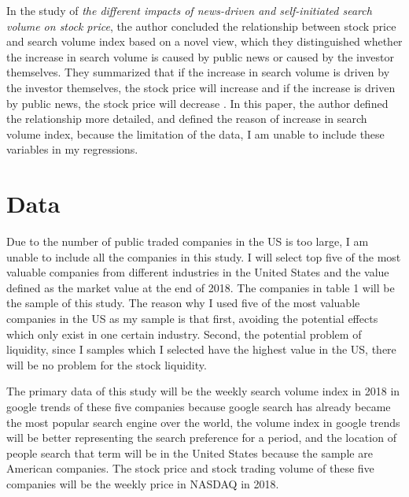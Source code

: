 \documentclass[12pt,english]{article}
\begin{document}
\newline
In the study of \textit{the different impacts of news-driven and self-initiated search volume on stock price}, the author concluded the relationship between stock price and search volume index based on a novel view, which they distinguished whether the increase in search volume is caused by public news or caused by the investor themselves. They summarized that if the increase in search volume is driven by the investor themselves, the stock price will increase and if the increase is driven by public news, the stock price will decrease \citep{liu2016different}. In this paper, the author defined the relationship more detailed, and defined the reason of increase in search volume index, because the limitation of the data, I am unable to include these variables in my regressions.


\section{Data}
Due to the number of public traded companies in the US is too large, I am unable to include all the companies in this study. I will select top five of the most valuable companies from different industries in the United States and the value defined as the market value at the end of 2018. The companies in table 1 will be the sample of this study. The reason why I used five of the most valuable companies in the US as my sample is that first, avoiding the potential effects which only exist in one certain industry. Second, the potential problem of liquidity, since I samples which I selected have the highest value in the US, there will be no problem for the stock liquidity.
\newline

\newline
The primary data of this study will be the weekly search volume index in 2018 in google trends of these five companies because google search has already became the most popular search engine over the world, the volume index in google trends will be better representing the search preference for a period, and the location of people search that term will be in the United States because the sample are American companies. The stock price and stock trading volume of these five companies will be the weekly price in NASDAQ in 2018. 
\newline
\end{document}
